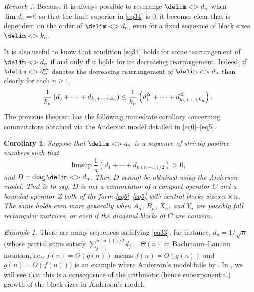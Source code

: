\documentclass[10pt,reqno]{amsart}
\newtheorem{corollary}[theorem]{Corollary}
\theoremstyle{remark}
\newtheorem{example}[theorem]{Example}
\newtheorem*{remar}{Remark}
\newcommand\openbigstar[1][0.65]{%
  \scalerel*{%
    \stackinset{c}{0pt}{c}{}{\scalebox{#1}{\color{white}{$\bigstar$}}}{%
      $\bigstar$}%
  }{\bigstar}
}
\DeclareMathOperator{\diag}{diag}
\newcommand{\seq}{\delim<>}
\renewcommand{\star}{\openbigstar}
\numberwithin{equation}{section}
\begin{document}
\begin{remar}
  Because it is always possible to rearrange $\seq{d_n}$ when $\lim d_n=0$ so that the limit superior in \eqref{eq34} is 0, it becomes clear that  is dependent on the order of $\seq{d_n}$, even for a fixed sequence of block sizes $\seq{k_n}$.

  It is also useful to know that condition \eqref{eq34} holds for some rearrangement of $\seq{d_n}$ if and only if it holds for its decreasing rearrangement.
  Indeed, if $\seq{d_n^{\star}}$ denotes the decreasing rearrangement of $\seq{d_n}$ then clearly for each $n \ge 1$,
  \begin{equation*}
    \frac{1}{k_n}\left(d_1 +  \cdots + d_{k_1+\dots+k_n}\right)\le \frac{1}{k_n}\left(d_1^{\star} +  \cdots + d_{k_1+\dots+k_n}^{\star}\right).
  \end{equation*}
\end{remar}

The previous theorem has the following immediate corollary concerning commutators obtained via the Anderson model detailed in \eqref{eq6}--\eqref{eq5}.

\begin{corollary}
  \label{cor:anderson-model-obstruction}
  Suppose that $\seq{d_n}$ is a sequence of strictly positive numbers such that
  \begin{equation}
    \label{eq33}
    \limsup \frac{1}{n}\left(d_1 +  \cdots + d_{n(n+1)/2}\right)> 0,
  \end{equation}
  and $D = \diag\seq{d_n}$.
  Then $D$ cannot be obtained using the Anderson model.
  That is to say, $D$ is not a commutator of a compact  operator $C$ and a bounded operator $Z$ both of the form \eqref{eq6}--\eqref{eq5} with central blocks sizes  $n\times n$.
  The same holds even more generally when $A_n$, $B_n$, $X_n$, and $Y_n$ are possibly full rectangular matrices, or even if the diagonal blocks of $C$ are nonzero.
\end{corollary}

\begin{example}
  \label{ex:anderson-model-failure}
  There are many sequences satisfying \eqref{eq33}, for instance, $d_n = {1}/{\sqrt{n}}$ (whose partial sums satisfy $\sum^{n(n+1)/2}_{j=1} d_j = \Theta(n)$ in Bachmann--Landau notation, i.e., $f(n) = \Theta(g(n))$ means $f(n) = O(g(n))$ and $g(n) = O(f(n))$) is an example where Anderson's model fails by .
  In , we will see that this is a consequence of the arithmetic (hence subexponential) growth of the block sizes in Anderson's model.
\end{example}
\end{document}
